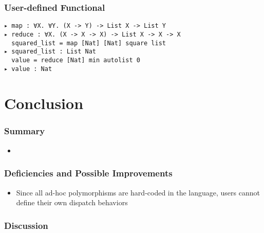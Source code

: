 \documentclass{beamer}
\begin{document}
\begin{frame}[fragile]
    \frametitle{User-defined Functional}

    \begin{example}
        \verb|▸ map : ∀X. ∀Y. (X -> Y) -> List X -> List Y|
        \\
        \verb|▸ reduce : ∀X. (X -> X -> X) -> List X -> X -> X|
        \\
        \verb|  squared_list = map [Nat] [Nat] square list|
        \\
        \verb|▸ squared_list : List Nat|
        \\
        \verb|  value = reduce [Nat] min autolist 0|
        \\
        \verb|▸ value : Nat|
    \end{example}    

\end{frame}

\section{Conclusion}

\begin{frame}
    \frametitle{Summary}
  
    \begin{itemize}
      \item 
    \end{itemize}

\end{frame}

\begin{frame}
    \frametitle{Deficiencies and Possible Improvements}
  
    \begin{itemize}
      \item Since all ad-hoc polymorphisms are hard-coded in the language, users cannot define their own dispatch behaviors
    \end{itemize}

\end{frame}

\begin{frame}
\frametitle{Discussion}

\end{frame}
\end{document}
